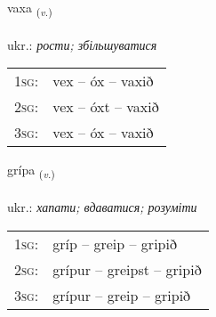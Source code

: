 \documentclass[frontgrid, backgrid]{flacards}\usepackage[]{graphicx}\usepackage[]{xcolor}
\begin{document}
\renewcommand{\flhead}{\vskip5pt \fboxsep=0pt {\small\bfseries\footnotesize Sagnorð | дієслово}}
\renewcommand{\fcfoot}{\vskip5pt \fboxsep=0pt \hspace{2pt}{\small\bfseries\footnotesize 1K}}

\renewcommand{\blhead}{\vskip5pt {\small\bfseries\footnotesize Sagnorð | дієслово }}
\renewcommand{\bcfoot}{\vskip5pt \hspace{2pt}{\small\bfseries\footnotesize 1K}}


{vaxa \small{\textsubscript{(\textit{v.})}} \\[1ex] %
\textphonetic{[vaksa]} \\
ukr.: \emph{рости; збільшуватися} \\  [2ex]
\renewcommand*{\arraystretch}{0.8}
\begin{tabular}{p{1cm}l}
\textsc{1sg}: & vex -- óx -- vaxið \\ 
\textsc{2sg}: & vex -- óxt -- vaxið \\ 
\textsc{3sg}: & vex -- óx -- vaxið \\ 
\end{tabular}
}

\renewcommand{\flhead}{\vskip5pt \fboxsep=0pt {\small\bfseries\footnotesize Sagnorð | дієслово}}
\renewcommand{\fcfoot}{\vskip5pt \fboxsep=0pt \hspace{2pt}{\small\bfseries\footnotesize 1K}}

\renewcommand{\blhead}{\vskip5pt {\small\bfseries\footnotesize Sagnorð | дієслово }}
\renewcommand{\bcfoot}{\vskip5pt \hspace{2pt}{\small\bfseries\footnotesize 1K}}


{grípa \small{\textsubscript{(\textit{v.})}} \\[1ex] %
\textphonetic{[kriːpa]} \\
ukr.: \emph{хапати; вдаватися; розуміти} \\  [2ex]
\renewcommand*{\arraystretch}{0.8}
\begin{tabular}{p{1cm}l}
\textsc{1sg}: & gríp -- greip -- gripið \\ 
\textsc{2sg}: & grípur -- greipst -- gripið \\ 
\textsc{3sg}: & grípur -- greip -- gripið \\ 
\end{tabular}
}
\end{document}

